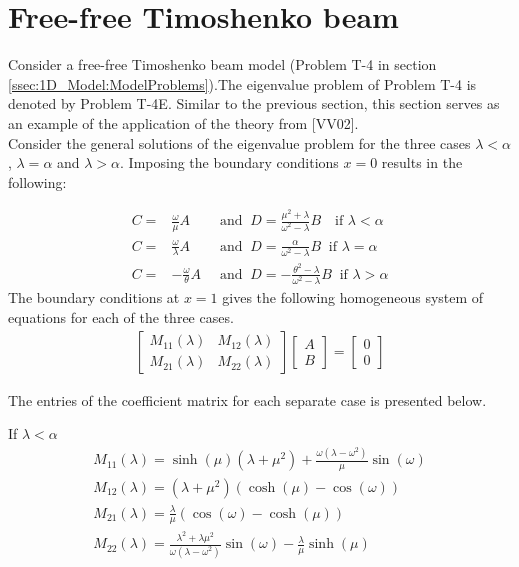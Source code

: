 \documentclass[../../main.tex]{subfiles}
\begin{document}
\section{Free-free Timoshenko beam}\label{sec:Timo:Free}
Consider a free-free Timoshenko beam model (Problem T-4 in section \ref{ssec:1D_Model:ModelProblems}).The eigenvalue problem of Problem T-4 is denoted by Problem T-4E. Similar to the previous section, this section serves as an example of the application of the theory from [VV02].\\

Consider the general solutions of the eigenvalue problem for the three cases $\lambda < \alpha$, $\lambda = \alpha$ and $\lambda > \alpha$. Imposing the boundary conditions $x = 0$ results in the following:

\begin{align}
	C  =&  \frac{\omega}{\mu}A &\textrm{ and } \ D = \frac{ \mu^2+\lambda}{\omega^2-\lambda}B \ \ \ \textrm{ if } \lambda < \alpha \label{A1}\\
	C = & \frac{\omega}{\lambda}A \ &\textrm{ and } \ D = \frac{\alpha}{\omega^2-\lambda}B  \ \textrm{ if } \lambda = \alpha \label{A2}\\
	C= &-\frac{\omega}{\theta}A \ &\textrm{ and } \ D = -\frac{\theta^2-\lambda}{\omega^2 - \lambda}B  \ \textrm{ if } \lambda > \alpha \label{A3}
\end{align}
The boundary conditions at $x = 1$ gives the following homogeneous system of equations for each of the three cases.
\begin{align}
	\begin{bmatrix}
		M_{11}(\lambda) & M_{12}(\lambda)\\
		M_{21}(\lambda) & M_{22}(\lambda)
	\end{bmatrix}
	\begin{bmatrix}
		A\\
		B
	\end{bmatrix}
	= 
	\begin{bmatrix}
		0\\
		0
	\end{bmatrix}
	\label{eq:Timo:Free:SystemOfEquations}
\end{align}

The entries of the coefficient matrix for each separate case is presented below.

{If $\lambda < \alpha$}
\begin{align*}
	&M_{11}(\lambda) = \sinh(\mu)(\lambda+\mu^2) + \frac{\omega(\lambda - \omega^2)}{\mu}\sin(\omega)&\\
	&M_{12}(\lambda) = (\lambda+\mu^2)(\cosh(\mu)-\cos(\omega))& \\
	&M_{21}(\lambda) = \frac{\lambda}{\mu}(\cos(\omega) - \cosh(\mu))&\\
	&M_{22}(\lambda) =\frac{\lambda^2+\lambda\mu^2}{\omega(\lambda-\omega^2)}\sin(\omega) - \frac{\lambda }{\mu}\sinh(\mu)&
\end{align*}
\end{document}
